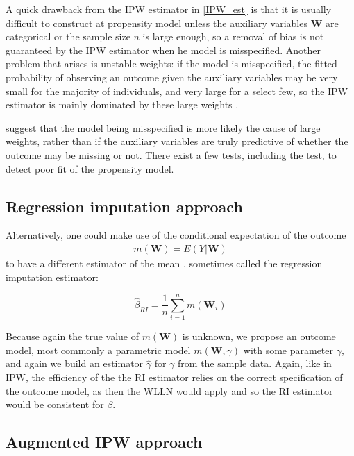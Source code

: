 \documentclass[12pt,twoside]{article}
\begin{document}
A quick drawback from the IPW estimator in \ref{IPW_est} is that it is usually difficult to construct at propensity model unless the auxiliary variables $\mathbf{W}$ are categorical or the sample size $n$ is large enough, so a removal of bias is not guaranteed by the IPW estimator when he model is misspecified. Another problem that arises is unstable weights: if the model is misspecified, the fitted probability of observing an outcome given the auxiliary variables may be very small for the majority of individuals, and very large for a select few, so the IPW estimator is mainly dominated by these large weights \citep{seaman}.

\citet{kang} suggest that the model being misspecified is more likely the cause of large weights, rather than if the auxiliary variables are truly predictive of whether the outcome may be missing or not. There exist a few tests, including the \citet{hosmer} test, to detect poor fit of the propensity model.\\

\subsection{Regression imputation approach} 

Alternatively, one could make use of the conditional expectation of the outcome 
\begin{align*}
    m(\mathbf{W}) = E(Y|\mathbf{W})
\end{align*}
to have a different estimator of the mean \citep{davidian,vansteelandt}, sometimes called the regression imputation estimator: 

\begin{equation}
    \hat{\beta}_ {RI} = \frac{1}{n}\sum_{i = 1}^n m(\mathbf{W}_i)
\end{equation}

Because again the true value of $m(\mathbf{W})$ is unknown, we propose an outcome model, most commonly a parametric model $m(\mathbf{W}, \gamma)$ with some parameter $\gamma$, and again we build an estimator $\hat{\gamma}$ for $\gamma$ from the sample data. Again, like in IPW, the efficiency of the the RI estimator relies on the correct specification of the outcome model, as then the WLLN would apply and so the RI estimator would be consistent for $\beta$. \\

\subsection{Augmented IPW approach} 
\end{document}
